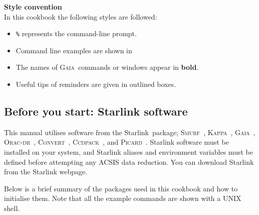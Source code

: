 \documentclass[twoside,11pt]{article}
\newcommand{\htmladdnormallink}[2]{#1}
\newcommand{\xref}[3]{#1}
\newcommand{\xlabel}[1]{}
\renewcommand{\_}{\texttt{\symbol{95}}}
\newcommand{\starlink}{\htmladdnormallink{Starlink}{http://starlink.jach.hawaii.edu}}
\newcommand{\ccdpack}{\xref{\textsc{Ccdpack}}{sun139}{}}
\newcommand{\convert}{\xref{\textsc{Convert}}{sun55}{}}
\newcommand{\gaia}{\xref{\textsc{Gaia}}{sun214}{}}
\newcommand{\Kappa}{\xref{\textsc{Kappa}}{sun95}{}}
\newcommand{\oracdr}{\htmladdnormallink{\textsc{Orac-dr}}{http://www.oracdr.org/oracdr}}
\newcommand{\picard}{\xref{\textsc{Picard}}{sun265}{}}
\newcommand{\smurf}{\xref{\textsc{Smurf}}{sun258}{}}
\begin{document}
\textbf{Style convention}\\
In this cookbook the following styles are followed:
\begin{itemize}[noitemsep,nolistsep]
\item \texttt{\%}  represents the command-line prompt.
\item Command line examples are shown in \texttt{\color{MidnightBlue}{navy typewriter font.}}
\item The names of \gaia\ commands or windows appear in \textbf{bold}.
\item Useful tips of reminders are given in outlined boxes.
\end{itemize}

\subsection{\xlabel{software}Before you start: Starlink software}

This manual utilises software from the \starlink\ package;
\smurf\ \cite{smurf}, \Kappa\ \cite{kappa}, \gaia\ \cite{gaia}, \oracdr\ \cite{oracdr}, \convert\ \cite{convert}, \ccdpack\ \cite{ccdpack}, and
\picard\ \cite{picard}. Starlink software must be installed on your system, and Starlink aliases
and environment variables must be defined before attempting any ACSIS data reduction. You can download Starlink from \xref{the Starlink webpage}{\starlink}{}.

Below is a brief summary of the packages used in this cookbook and how to initialise them. Note that all the example commands are shown with a UNIX shell.
\end{document}
